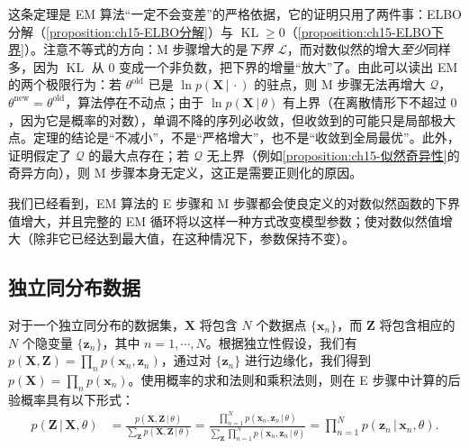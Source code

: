 \documentclass[../../main.tex]{subfiles}
\begin{document}
\begin{remark}
这条定理是 EM 算法“一定不会变差”的严格依据，它的证明只用了两件事：ELBO 分解（\cref{proposition:ch15-ELBO分解}）与 $\operatorname{KL}\geqslant0$（\cref{proposition:ch15-ELBO下界}）。注意不等式的方向：M 步骤增大的是\emph{下界} $\mathcal{L}$，而对数似然的增大\emph{至少}同样多，因为 $\operatorname{KL}$ 从 $0$ 变成一个非负数，把下界的增量“放大”了。由此可以读出 EM 的两个极限行为：若 $\theta^{\text{old}}$ 已是 $\ln p(\bm{X}\,|\,\cdot)$ 的驻点，则 M 步骤无法再增大 $\mathcal{Q}$，$\theta^{\text{new}}=\theta^{\text{old}}$，算法停在不动点；由于 $\ln p(\bm{X}\,|\,\theta)$ 有上界（在离散情形下不超过 $0$，因为它是概率的对数），单调不降的序列必收敛，但收敛到的可能只是局部极大点。定理的结论是“不减小”，不是“严格增大”，也不是“收敛到全局最优”。此外，证明假定了 $\mathcal{Q}$ 的最大点存在；若 $\mathcal{Q}$ 无上界（例如\cref{proposition:ch15-似然奇异性}的奇异方向），则 M 步骤本身无定义，这正是需要正则化的原因。
\end{remark}

我们已经看到，EM 算法的 E 步骤和 M 步骤都会使良定义的对数似然函数的下界值增大，并且完整的 EM 循环将以这样一种方式改变模型参数；使对数似然值增大（除非它已经达到最大值，在这种情况下，参数保持不变）。

\subsection{独立同分布数据}\label{subsection:ch15-独立同分布}

对于一个独立同分布的数据集，$\bm{X}$ 将包含 $N$ 个数据点 $\{\bm{x}_n\}$，而 $\bm{Z}$ 将包含相应的 $N$ 个隐变量 $\{\bm{z}_n\}$，其中 $n=1,\cdots,N$。根据独立性假设，我们有 $p(\bm{X},\bm{Z})=\prod_n p(\bm{x}_n,\bm{z}_n)$，通过对 $\{\bm{z}_n\}$ 进行边缘化，我们得到 $p(\bm{X})=\prod_n p(\bm{x}_n)$。使用概率的求和法则和乘积法则，则在 E 步骤中计算的后验概率具有以下形式：
\begin{align}
p(\bm{Z}\,|\,\bm{X},\theta)
&=\frac{p(\bm{X},\bm{Z}\,|\,\theta)}{\sum_{\bm{Z}}p(\bm{X},\bm{Z}\,|\,\theta)}
=\frac{\prod_{n=1}^{N}p(\bm{x}_n,\bm{z}_n\,|\,\theta)}{\sum_{\bm{Z}}\prod_{n=1}^{N}p(\bm{x}_n,\bm{z}_n\,|\,\theta)}
=\prod_{n=1}^{N}p(\bm{z}_n\,|\,\bm{x}_n,\theta).
\label{align:ch15-iid-posterior}
\end{align}
\end{document}
